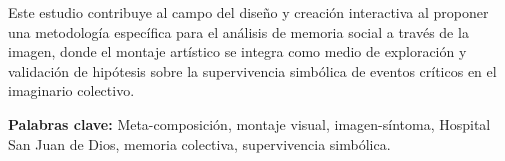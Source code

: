 Este estudio contribuye al campo del diseño y creación interactiva al proponer una metodología específica para el análisis de memoria social a través de la imagen, donde el montaje artístico se integra como medio de exploración y validación de hipótesis sobre la supervivencia simbólica de eventos críticos en el imaginario colectivo.

\vspace{1cm}
\textbf{Palabras clave:} \textcolor{edit30sept}{Meta-composición, montaje visual, imagen-síntoma, Hospital San Juan de Dios, memoria colectiva, supervivencia simbólica.}   
\pagebreak

